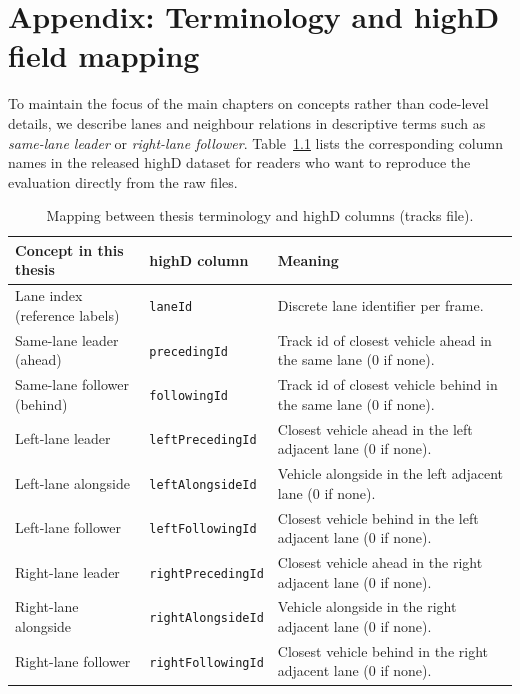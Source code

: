 \documentclass[12pt,a4paper,twoside,openright]{report}
\begin{document}
    \appendix
    \cleardoublepage

    \chapter{Appendix: Terminology and highD field mapping}
    \label{app:field-mapping}

    To maintain the focus of the main chapters on concepts rather than code-level details, we describe lanes and neighbour relations in descriptive terms such as \emph{same-lane leader} or \emph{right-lane follower}. Table~\ref{tab:field-mapping} lists the corresponding column names in the released highD dataset for readers who want to reproduce the evaluation directly from the raw files.

    \begin{table}[H]
        \centering
        \caption{Mapping between thesis terminology and highD columns (tracks file).}
        \label{tab:field-mapping}
        {\small
        \setlength{\tabcolsep}{4pt}
            \begin{tabularx}{\textwidth}{@{}l l X@{}}
\toprule
Concept in this thesis & highD column & Meaning \\
\midrule
Lane index (reference labels) & \texttt{laneId} & Discrete lane identifier per frame. \\
Same-lane leader (ahead) & \texttt{precedingId} & Track id of closest vehicle ahead in the same lane (0 if none). \\
Same-lane follower (behind) & \texttt{followingId} & Track id of closest vehicle behind in the same lane (0 if none). \\
Left-lane leader & \texttt{leftPrecedingId} & Closest vehicle ahead in the left adjacent lane (0 if none). \\
Left-lane alongside & \texttt{leftAlongsideId} & Vehicle alongside in the left adjacent lane (0 if none). \\
Left-lane follower & \texttt{leftFollowingId} & Closest vehicle behind in the left adjacent lane (0 if none). \\
Right-lane leader & \texttt{rightPrecedingId} & Closest vehicle ahead in the right adjacent lane (0 if none). \\
Right-lane alongside & \texttt{rightAlongsideId} & Vehicle alongside in the right adjacent lane (0 if none). \\
Right-lane follower & \texttt{rightFollowingId} & Closest vehicle behind in the right adjacent lane (0 if none). \\
\bottomrule
            \end{tabularx}}
    \end{table}
\end{document}
